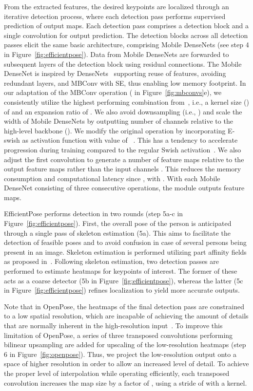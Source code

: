 From the extracted features, the desired keypoints are localized through an iterative detection process, where each detection pass performs supervised prediction of output maps. Each detection pass comprises a detection block and a single  convolution for output prediction. The detection blocks across all detection passes elicit the same basic architecture, comprising Mobile DenseNets (see step 4 in Figure~\ref{fig:efficientpose}). Data from Mobile DenseNets are forwarded to subsequent layers of the detection block using residual connections. The Mobile DenseNet is inspired by DenseNets~\cite{huang2017densely} supporting reuse of features, avoiding redundant layers, and MBConv with SE, thus enabling low memory footprint. In our adaptation of the MBConv operation ( in Figure~\ref{fig:mbconvs}e), we consistently utilize the highest performing combination from~\cite{tan2019mnasnet}, i.e., a kernel size () of  and an expansion ratio of . We also avoid downsampling (i.e., ) and scale the width of Mobile DenseNets by outputting number of channels relative to the high-level backbone (). We modify the original  operation by incorporating E-swish as activation function with  value of ~\cite{gagana2018activation}. This has a tendency to accelerate progression during training compared to the regular Swish activation~\cite{DBLP:conf/iclr/RamachandranZL18}. We also adjust the first  convolution to generate a number of feature maps relative to the output feature maps  rather than the input channels . This reduces the memory consumption and computational latency since , with . With each Mobile DenseNet consisting of three consecutive  operations, the module outputs  feature maps. 

EfficientPose performs detection in two rounds (step 5a-c in Figure~\ref{fig:efficientpose}). First, the overall pose of the person is anticipated through a single pass of skeleton estimation (5a). This aims to facilitate the detection of feasible poses and to avoid confusion in case of several persons being present in an image. Skeleton estimation is performed utilizing part affinity fields as proposed in~\cite{cao2017realtime}. Following skeleton estimation, two detection passes are performed to estimate heatmaps for keypoints of interest. The former of these acts as a coarse detector (5b in Figure~\ref{fig:efficientpose}), whereas the latter (5c in Figure~\ref{fig:efficientpose}) refines localization to yield more accurate outputs.

Note that in OpenPose, the heatmaps of the final detection pass are constrained to a low spatial resolution, which are incapable of achieving the amount of details that are normally inherent in the high-resolution input~\cite{cao2018openpose}. To improve this limitation of OpenPose, a series of three transposed convolutions performing bilinear upsampling are added for  upscaling of the low-resolution heatmaps (step 6 in Figure~\ref{fig:openpose}). Thus, we project the low-resolution output onto a space of higher resolution in order to allow an increased level of detail. To achieve the proper level of interpolation while operating efficiently, each transposed convolution increases the map size by a factor of , using a stride of  with a  kernel.

